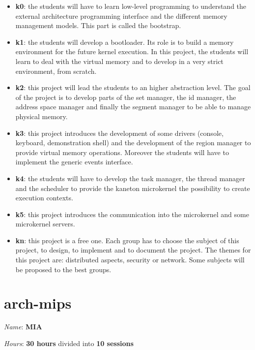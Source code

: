 \begin{multicols}{2}
\begin{itemize}
  \item
    \textbf{k0}: the students will have to learn low-level programming to
    understand the external architecture programming interface and the
    different memory management models. This part is called the bootstrap.
  \item
    \textbf{k1}: the students will develop a bootloader. Its role is to
    build a memory environment for the future kernel execution. In this
    project, the students will learn to deal with the virtual memory
    and to develop in a very strict environment, from scratch.
  \item
    \textbf{k2}: this project will lead the students to an higher abstraction
    level. The goal of the project is to develop parts of the set manager,
    the id manager, the address space manager and finally the segment
    manager to be able to manage physical memory.
  \item
    \textbf{k3}: this project introduces the development of some drivers
    (console, keyboard, demonstration shell) and the development of the
    region manager to provide virtual memory operations. Moreover the
    students will have to implement the generic events interface.
  \item
    \textbf{k4}: the students will have to develop the task manager, the
    thread manager and the scheduler to provide the kaneton microkernel
    the possibility to create execution contexts.
  \item
    \textbf{k5}: this project introduces the communication into the
    microkernel and some microkernel servers.
  \item
    \textbf{kn}: this project is a free one. Each group has to choose the
    subject of this project, to design, to implement and to document
    the project. The themes for this project are: distributed aspects,
    security or network. Some subjects will be proposed to the best groups.
\end{itemize}



%
%

\section{arch-mips}

\textit{Name}: \textbf{MIA}

\textit{Hours}: \textbf{30 hours} divided into \textbf{10 sessions}


\end{multicols}
